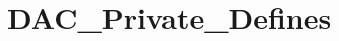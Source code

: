 \hypertarget{group___d_a_c___private___defines}{\section{D\-A\-C\-\_\-\-Private\-\_\-\-Defines}
\label{group___d_a_c___private___defines}
}
